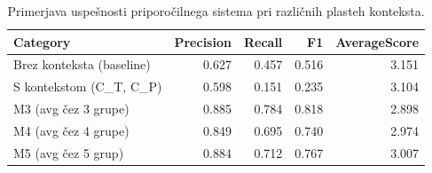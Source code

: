 \begin{table}[h]
\centering
\caption{Primerjava uspešnosti priporočilnega sistema pri različnih plasteh konteksta.}
\label{tab:table_4_5}
\begin{tabular}{lrrrr}
\toprule
Category & Precision & Recall & F1 & AverageScore \\
\midrule
Brez konteksta (baseline) & 0.627 & 0.457 & 0.516 & 3.151 \\
S kontekstom (C\_T, C\_P) & 0.598 & 0.151 & 0.235 & 3.104 \\
M3 (avg čez 3 grupe) & 0.885 & 0.784 & 0.818 & 2.898 \\
M4 (avg čez 4 grupe) & 0.849 & 0.695 & 0.740 & 2.974 \\
M5 (avg čez 5 grup) & 0.884 & 0.712 & 0.767 & 3.007 \\
\bottomrule
\end{tabular}

\end{table}
